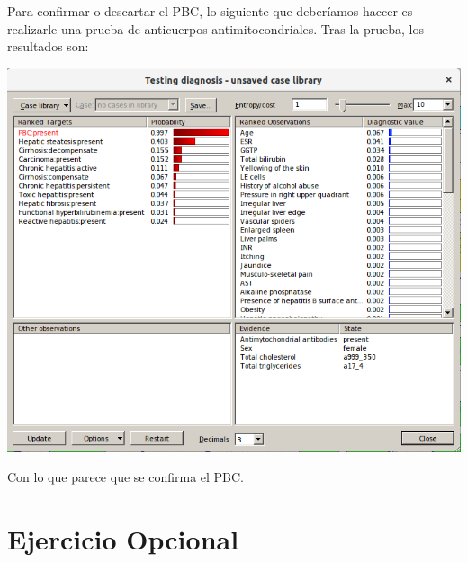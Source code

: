 \documentclass{article}
\begin{document}
\begin{enumerate}[label=\alph*)]
Para confirmar o descartar el PBC, lo siguiente que deberíamos haccer es realizarle una prueba de anticuerpos antimitocondriales. Tras la prueba, los resultados son:

\begin{flushleft}
\includegraphics[scale=0.4]{hepasol2.png}
\end{flushleft}

Con lo que parece que se confirma el PBC.
\end{enumerate}

\section{\textbf{Ejercicio Opcional}}
\end{document}
